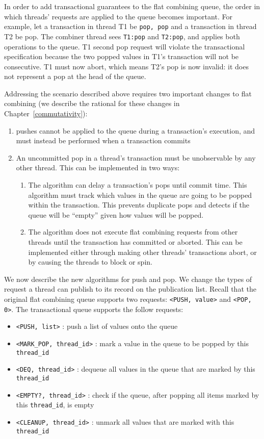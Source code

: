 In order to add transactional guarantees to the flat combining queue, the order in which threads' requests are applied to the queue becomes important. For example, let a transaction in thread T1 be \texttt{pop, pop} and a transaction in thread T2 be pop. The combiner thread sees \texttt{T1:pop} and \texttt{T2:pop}, and applies both operations to the queue. T1 second pop request will violate the transactional specification because the two popped values in T1's transaction will not be consecutive. T1 must now abort, which means T2's pop is now invalid: it does not represent a pop at the head of the queue.

Addressing the scenario described above requires two important changes to flat combining (we describe the rational for these changes in Chapter~\ref{commutativity}): 
\begin{enumerate}
\item pushes cannot be applied to the queue during a transaction's execution, and must instead be performed when a transaction commits
\item An uncommitted pop in a thread's transaction must be unobservable by any other thread. This can be implemented in two ways:  
    \begin{enumerate}
        \item The algorithm can delay a transaction's pops until commit time. This algorithm must track which values in the queue are going to be popped within the transaction. This prevents duplicate pops and detects if the queue will be ``empty'' given how values will be popped.
        \item The algorithm does not execute flat combining requests from other threads until the transaction has committed or aborted. This can be implemented either through making other threads' transactions abort, or by causing the threads to block or spin.
    \end{enumerate}
\end{enumerate}

We now describe the new algorithms for push and pop.  We change the types of request a thread can publish to its record on the publication list. Recall that the original flat combining queue supports two requests: \texttt{<PUSH, value>} and \texttt{<POP, 0>}. The transactional queue supports the follow requests:
\begin{itemize}
    \item \texttt{<PUSH, list>} : push a list of values onto the queue
    \item \texttt{<MARK\_POP, thread\_id>} : mark a value in the queue to be popped by this \texttt{thread\_id}
    \item \texttt{<DEQ, thread\_id>} : dequeue all values in the queue that are marked by this \texttt{thread\_id}
    \item \texttt{<EMPTY?, thread\_id>} : check if the queue, after popping all items marked by this \texttt{thread\_id}, is empty
    \item \texttt{<CLEANUP, thread\_id>} : unmark all values that are marked with this \texttt{thread\_id}
\end{itemize}

